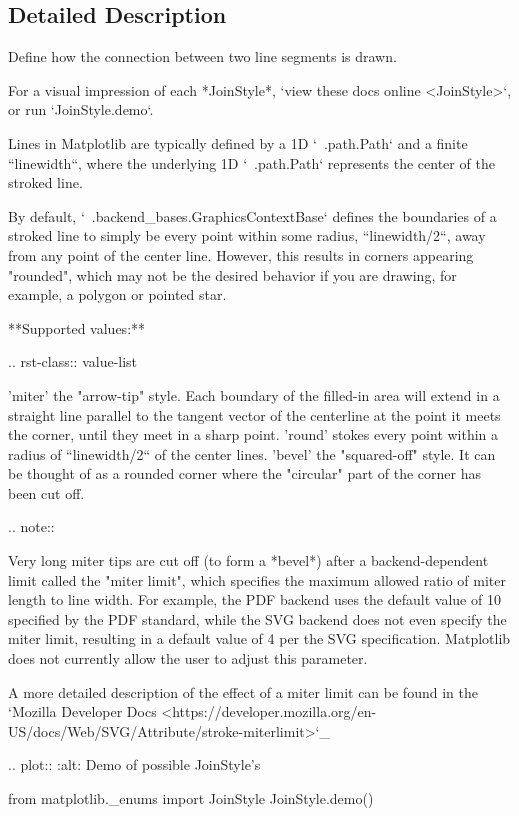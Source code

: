 \subsection{Detailed Description}
\begin{DoxyVerb}Define how the connection between two line segments is drawn.

For a visual impression of each *JoinStyle*, `view these docs online
<JoinStyle>`, or run `JoinStyle.demo`.

Lines in Matplotlib are typically defined by a 1D `~.path.Path` and a
finite ``linewidth``, where the underlying 1D `~.path.Path` represents the
center of the stroked line.

By default, `~.backend_bases.GraphicsContextBase` defines the boundaries of
a stroked line to simply be every point within some radius,
``linewidth/2``, away from any point of the center line. However, this
results in corners appearing "rounded", which may not be the desired
behavior if you are drawing, for example, a polygon or pointed star.

**Supported values:**

.. rst-class:: value-list

    'miter'
        the "arrow-tip" style. Each boundary of the filled-in area will
        extend in a straight line parallel to the tangent vector of the
        centerline at the point it meets the corner, until they meet in a
        sharp point.
    'round'
        stokes every point within a radius of ``linewidth/2`` of the center
        lines.
    'bevel'
        the "squared-off" style. It can be thought of as a rounded corner
        where the "circular" part of the corner has been cut off.

.. note::

    Very long miter tips are cut off (to form a *bevel*) after a
    backend-dependent limit called the "miter limit", which specifies the
    maximum allowed ratio of miter length to line width. For example, the
    PDF backend uses the default value of 10 specified by the PDF standard,
    while the SVG backend does not even specify the miter limit, resulting
    in a default value of 4 per the SVG specification. Matplotlib does not
    currently allow the user to adjust this parameter.

    A more detailed description of the effect of a miter limit can be found
    in the `Mozilla Developer Docs
    <https://developer.mozilla.org/en-US/docs/Web/SVG/Attribute/stroke-miterlimit>`_

.. plot::
    :alt: Demo of possible JoinStyle's

    from matplotlib._enums import JoinStyle
    JoinStyle.demo()\end{DoxyVerb}
 


